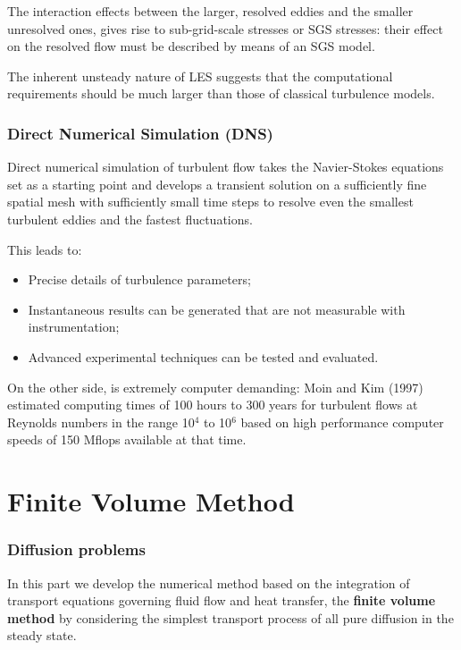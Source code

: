 \documentclass[a4paper, 15pt]{article}
\begin{document}
The
interaction effects between the larger, resolved eddies and the smaller unresolved ones,
gives rise to sub-grid-scale stresses or SGS stresses: their effect on the resolved flow must be
described by means of an SGS model. \newline 

The
inherent unsteady nature of LES suggests that the computational requirements should be
much larger than those of classical turbulence models. 

\newpage
\section{Direct Numerical Simulation (DNS)}

	Direct
	numerical simulation of turbulent flow takes the Navier-Stokes equations set as a starting
	point and develops a transient solution on a sufficiently fine spatial mesh with sufficiently small
	time steps to resolve even the smallest turbulent eddies and the fastest fluctuations. \newline 
	
	This leads to: 
	\begin{itemize}
		\item Precise
		details of turbulence parameters;
		\item Instantaneous
		results can be generated that are not measurable with instrumentation;
		\item Advanced
		experimental techniques can be tested and evaluated. 
	\end{itemize}
	
	On the other side, is extremely computer demanding:  Moin
	and Kim (1997) estimated computing times of 100 hours to 300 years for turbulent flows at
	Reynolds numbers in the range 10$^4$ to 10$^6$ based on high performance computer speeds of 150 Mflops available at that time. 

\newpage
\part{Finite Volume Method}
\section{Diffusion problems}

	In
	this part we develop the numerical method based on the integration of transport equations
	governing fluid flow and heat transfer, the \textbf{finite volume method} by considering the simplest
	transport process of all pure diffusion in the steady state. \newline 
	
\end{document}
